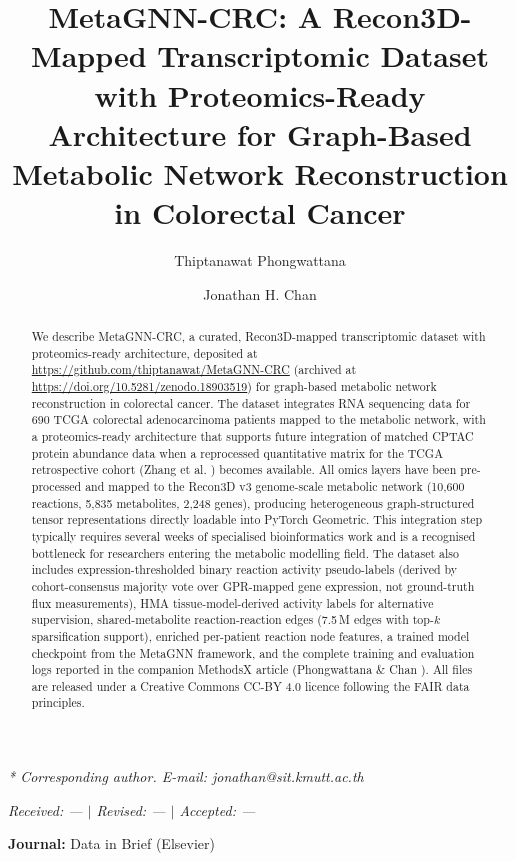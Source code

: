 \documentclass[12pt,a4paper]{article}
\begin{document}
\title{MetaGNN-CRC: A Recon3D-Mapped Transcriptomic Dataset with Proteomics-Ready Architecture for Graph-Based Metabolic Network Reconstruction in Colorectal Cancer}

\author[1]{Thiptanawat Phongwattana}
\author[1,*]{Jonathan H. Chan}
\date{}
\maketitle

\noindent\textit{* Corresponding author. E-mail: jonathan@sit.kmutt.ac.th}

\noindent\textit{Received: --- $|$ Revised: --- $|$ Accepted: ---}

\vspace{0.5cm}
\noindent\textbf{Journal:} Data in Brief (Elsevier)

\begin{abstract}
We describe MetaGNN-CRC, a curated, Recon3D-mapped transcriptomic dataset with proteomics-ready architecture, deposited at \url{https://github.com/thiptanawat/MetaGNN-CRC} (archived at \url{https://doi.org/10.5281/zenodo.18903519}) for graph-based metabolic network reconstruction in colorectal cancer. The dataset integrates RNA sequencing data for 690 TCGA colorectal adenocarcinoma patients mapped to the metabolic network, with a proteomics-ready architecture that supports future integration of matched CPTAC protein abundance data when a reprocessed quantitative matrix for the TCGA retrospective cohort (Zhang et al. \cite{Zhang2014}) becomes available. All omics layers have been pre-processed and mapped to the Recon3D v3 genome-scale metabolic network (10,600 reactions, 5,835 metabolites, 2,248 genes), producing heterogeneous graph-structured tensor representations directly loadable into PyTorch Geometric. This integration step typically requires several weeks of specialised bioinformatics work and is a recognised bottleneck for researchers entering the metabolic modelling field. The dataset also includes expression-thresholded binary reaction activity pseudo-labels (derived by cohort-consensus majority vote over GPR-mapped gene expression, not ground-truth flux measurements), HMA tissue-model-derived activity labels for alternative supervision, shared-metabolite reaction-reaction edges (7.5\,M edges with top-$k$ sparsification support), enriched per-patient reaction node features, a trained model checkpoint from the MetaGNN framework, and the complete training and evaluation logs reported in the companion MethodsX article (Phongwattana \& Chan \cite{Phongwattana2026}). All files are released under a Creative Commons CC-BY 4.0 licence following the FAIR data principles.
\end{abstract}
\end{document}
